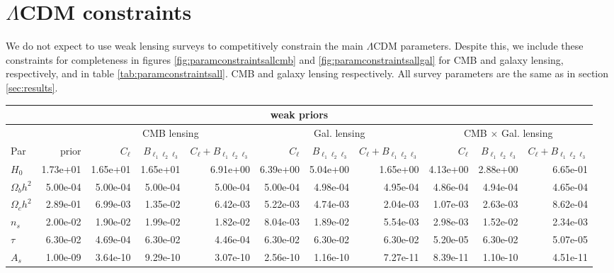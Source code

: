 \documentclass[11pt]{article} %
\begin{document}
\section{$\Lambda$CDM constraints}
\label{sec:lambdacdmconstraints}

We do not expect to use weak lensing surveys to competitively constrain the main $\Lambda$CDM parameters. Despite this, we include these constraints for completeness in figures \ref{fig:paramconstraintsallcmb} and \ref{fig:paramconstraintsallgal} for CMB and galaxy lensing, respectively, and in table \ref{tab:paramconstraintsall}. CMB and galaxy lensing respectively. All survey parameters are the same as in section \ref{sec:results}.
\begin{table}[h!]
    \centering
    \tiny
    \begin{tabular}{|l|r|rrr|rrr|rrr|}
        \hline
        \multicolumn{11}{|c|}{weak priors} \\
        \hline
        && \multicolumn{3}{c|}{CMB lensing}& \multicolumn{3}{c|}{Gal. lensing}& \multicolumn{3}{c|}{CMB $\times$ Gal. lensing} \\
        \hline
        Par            &   prior &   $C_\ell$ &   $B_{\ell_1\ell_2\ell_3}$ &   $C_\ell + B_{\ell_1\ell_2\ell_3}$ &   $C_\ell$ &   $B_{\ell_1\ell_2\ell_3}$ &   $C_\ell + B_{\ell_1\ell_2\ell_3}$ &   $C_\ell$ &   $B_{\ell_1\ell_2\ell_3}$ &   $C_\ell + B_{\ell_1\ell_2\ell_3}$ \\
        \hline
        $H_0$          &     1.73e+01 &  1.65e+01 &  1.65e+01 &        6.91e+00 & 6.39e+00 & 5.04e+00 &      1.65e+00 &      4.13e+00 &      2.88e+00 &             6.65e-01 \\
        $\Omega_b h^2$ &     5.00e-04 &  5.00e-04 &  5.00e-04 &        5.00e-04 & 5.00e-04 & 4.98e-04 &      4.95e-04 &      4.86e-04 &      4.94e-04 &             4.65e-04 \\
        $\Omega_c h^2$ &     2.89e-01 &  6.99e-03 &  1.35e-02 &        6.42e-03 & 5.22e-03 & 4.74e-03 &      2.04e-03 &      1.07e-03 &      2.63e-03 &             8.62e-04 \\
        $n_s$          &     2.00e-02 &  1.90e-02 &  1.99e-02 &        1.82e-02 & 8.04e-03 & 1.89e-02 &      5.54e-03 &      2.98e-03 &      1.52e-02 &             2.34e-03 \\
        $\tau$         &     6.30e-02 &  4.69e-04 &  6.30e-02 &        4.46e-04 & 6.30e-02 & 6.30e-02 &      6.30e-02 &      5.20e-05 &      6.30e-02 &             5.07e-05 \\
        $A_s$          &     1.00e-09 &  3.64e-10 &  9.29e-10 &        3.07e-10 & 2.56e-10 & 1.16e-10 &      7.27e-11 &      8.39e-11 &      1.10e-10 &             4.51e-11 \\

\end{tabular}
\end{table}
\end{document}
